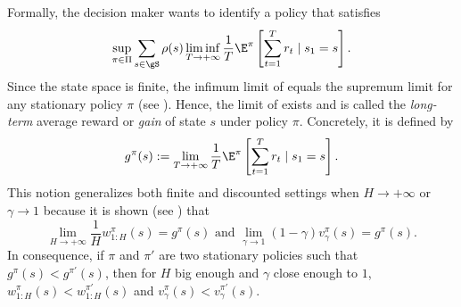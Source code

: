 Formally, the decision maker wants to identify a policy that satisfies
\begin{equation}
    \label{eq:avg_obj}
    \sup_{\pi\in\Pi}\sum_{s\in\gS}\rho(s)\liminf_{T\to+\infty}\frac1T \E^\pi\left[ \sum_{t=1}^{T} r_t \mid s_1=s\right].
\end{equation}
Since the state space is finite, the infimum limit of  equals the supremum limit for any stationary policy $\pi$ (see \cite[Chapter~8]{puterman2014markov}).
Hence, the limit of  exists and is called the \emph{long-term} average reward or \emph{gain} of state $s$ under policy $\pi$.
Concretely, it is defined by
\begin{equation}
    \label{eq:gain_defn}
    g^\pi(s) := \lim_{T\to+\infty}\frac1T \E^\pi\left[ \sum_{t=1}^{T} r_t \mid s_1=s\right].
\end{equation}
This notion generalizes both finite and discounted settings when $H\to+\infty$ or $\gamma\to1$ because it is shown (see \cite[Sections~8.2.1 and 8.2.2]{puterman2014markov}) that 
\begin{equation}
    \label{ch:mdp:eq:equi_gain_value}
    \lim_{H\to+\infty}\frac1H w^\pi_{1:H}(s) =g^\pi(s) \text{ and }
    \lim_{\gamma\to1}(1-\gamma)v^\pi_\gamma(s) =g^\pi(s).
\end{equation}
In consequence, if $\pi$ and $\pi'$ are two stationary policies such that $g^\pi(s)< g^{\pi'}(s)$, then for $H$ big enough and $\gamma$ close enough to $1$, $w_{1:H}^\pi(s)< w_{1:H}^{\pi'}(s)$ and $v^\pi_\gamma(s)< v^{\pi'}_\gamma(s)$.

